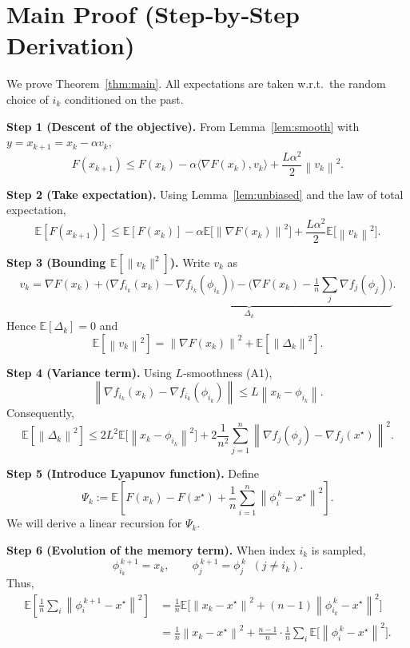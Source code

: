 \documentclass[11pt]{article}
\newcommand{\E}{\mathbb{E}}
\newcommand{\norm}[1]{\left\|#1\right\|}
\newcommand{\inner}[2]{\langle #1,#2\rangle}
\newcommand{\grad}{\nabla}
\begin{document}
\section*{Main Proof (Step‑by‑Step Derivation)}
We prove Theorem~\ref{thm:main}. All expectations are taken w.r.t.\ the random choice of $i_k$ conditioned on the past.

\noindent\textbf{Step 1 (Descent of the objective).}  
From Lemma~\ref{lem:smooth} with $y=x_{k+1}=x_k-\alpha v_k$,
\[
F(x_{k+1})\le F(x_k)-\alpha\inner{\grad F(x_k)}{v_k}
               +\frac{L\alpha^{2}}{2}\norm{v_k}^{2}.
\tag{S1}
\]

\noindent\textbf{Step 2 (Take expectation).}  
Using Lemma~\ref{lem:unbiased} and the law of total expectation,
\[
\E[F(x_{k+1})]
\le \E[F(x_k)]-\alpha\E\!\bigl[\norm{\grad F(x_k)}^{2}\bigr]
   +\frac{L\alpha^{2}}{2}\E\!\bigl[\norm{v_k}^{2}\bigr].
\tag{S2}
\]

\noindent\textbf{Step 3 (Bounding $\E[\|v_k\|^{2}]$).}  
Write $v_k$ as
\[
v_k = \grad F(x_k) + \underbrace{\bigl(\grad f_{i_k}(x_k)-\grad f_{i_k}(\phi_{i_k})\bigr)
             -\bigl(\grad F(x_k)-\tfrac1n\sum_{j}\grad f_j(\phi_j)\bigr)}_{\Delta_k}.
\]
Hence $\E[\Delta_k]=0$ and
\[
\E[\norm{v_k}^{2}]
= \norm{\grad F(x_k)}^{2} + \E[\norm{\Delta_k}^{2}].
\tag{S3}
\]

\noindent\textbf{Step 4 (Variance term).}  
Using $L$‑smoothness (A1),
\[
\norm{\grad f_{i_k}(x_k)-\grad f_{i_k}(\phi_{i_k})}
\le L\norm{x_k-\phi_{i_k}}.
\]
Consequently,
\[
\E[\norm{\Delta_k}^{2}]
\le 2L^{2}\E\!\bigl[\norm{x_k-\phi_{i_k}}^{2}\bigr]
   +2\frac{1}{n^{2}}\sum_{j=1}^{n}\norm{\grad f_j(\phi_j)-\grad f_j(x^\star)}^{2}.
\tag{S4}
\]

\noindent\textbf{Step 5 (Introduce Lyapunov function).}  
Define
\[
\Psi_k:=\E\!\left[F(x_k)-F(x^\star)
   +\frac{1}{n}\sum_{i=1}^{n}\norm{\phi_i^{\,k}-x^\star}^{2}\right].
\tag{S5}
\]
We will derive a linear recursion for $\Psi_k$.

\noindent\textbf{Step 6 (Evolution of the memory term).}  
When index $i_k$ is sampled,
\[
\phi_{i_k}^{\,k+1}=x_k,\qquad
\phi_j^{\,k+1}=\phi_j^{\,k}\;\;(j\neq i_k).
\]
Thus,
\[
\begin{aligned}
\E\!\left[\frac{1}{n}\sum_{i}\norm{\phi_i^{\,k+1}-x^\star}^{2}\right]
&= \frac{1}{n}\E\!\bigl[\norm{x_k-x^\star}^{2}
      +(n-1)\norm{\phi_{i_k}^{\,k}-x^\star}^{2}\bigr]  \\
&= \frac{1}{n}\norm{x_k-x^\star}^{2}
   +\frac{n-1}{n}\cdot\frac{1}{n}\sum_{i}\E\!\bigl[\norm{\phi_i^{\,k}-x^\star}^{2}\bigr].
\end{aligned}
\tag{S6}
\]
\end{document}
